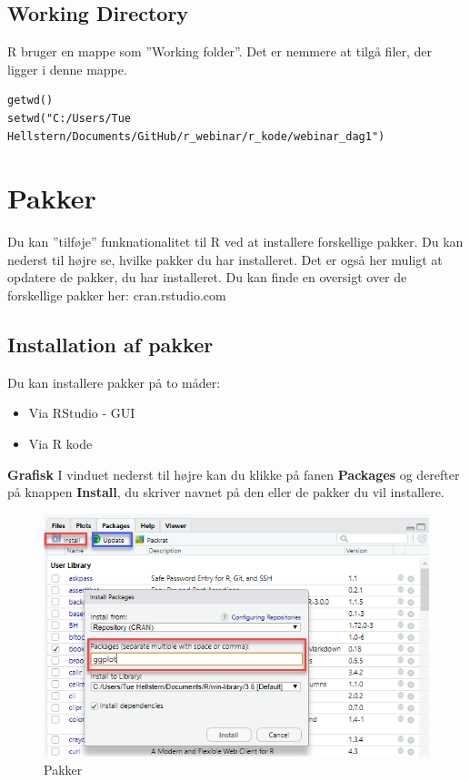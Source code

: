 \documentclass[
]{book}
\providecommand{\tightlist}{%
  \setlength{\itemsep}{0pt}\setlength{\parskip}{0pt}}
\begin{document}
\hypertarget{working-directory}{%
\section{Working Directory}\label{working-directory}}

R bruger en mappe som ''Working folder''. Det er nemmere at tilgå filer, der ligger i denne mappe.

\begin{verbatim}
getwd()
setwd("C:/Users/Tue Hellstern/Documents/GitHub/r_webinar/r_kode/webinar_dag1")
\end{verbatim}

\hypertarget{pakker}{%
\chapter{Pakker}\label{pakker}}

Du kan ''tilføje'' funknationalitet til R ved at installere forskellige pakker. Du kan nederst til højre se, hvilke pakker du har installeret.
Det er også her muligt at opdatere de pakker, du har installeret.
Du kan finde en oversigt over de forskellige pakker her: cran.rstudio.com

\hypertarget{installation-af-pakker}{%
\section{Installation af pakker}\label{installation-af-pakker}}

Du kan installere pakker på to måder:

\begin{itemize}
\tightlist
\item
  Via RStudio - GUI
\item
  Via R kode
\end{itemize}

\textbf{Grafisk}
I vinduet nederst til højre kan du klikke på fanen \textbf{Packages} og derefter på knappen \textbf{Install}, du skriver navnet på den eller de pakker du vil installere.

\begin{figure}
\centering
\includegraphics{img/pakker.png}
\caption{Pakker}
\end{figure}
\end{document}
